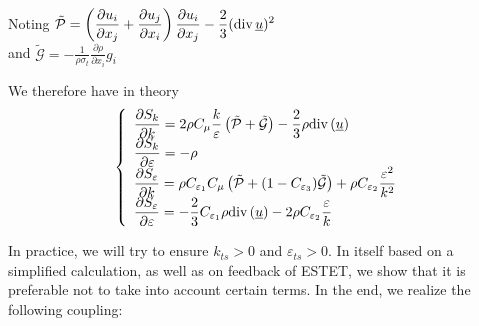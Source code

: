 Noting
$\displaystyle\tilde{\mathcal{P}}
= \left(\frac{\partial u_i}{\partial x_j} +
\frac{\partial u_j}{\partial x_i}\right)\frac{\partial u_i}{\partial x_j}
-\frac{2}{3}(\text{div}\,\underline{u})^2$\\
and
$\displaystyle\tilde{\mathcal{G}}
= -\frac{1}{\rho\sigma_t}
\frac{\partial\rho}{\partial x_i}g_i$

We therefore have in theory
\begin{equation}
\left\{\begin{array}{l}
\displaystyle \frac{\partial S_k}{\partial k}=
2\rho C_\mu\frac{k}{\varepsilon}\left(\tilde{\mathcal{P}}+\tilde{\mathcal{G}}\right)
-\frac{2}{3}\rho \text{div}\,(\underline{u})\\
\displaystyle \frac{\partial S_k}{\partial \varepsilon}= -\rho\\
\displaystyle \frac{\partial S_\varepsilon}{\partial k}=
\rho C_{\varepsilon_1} C_\mu \left(\tilde{\mathcal{P}}
+(1-C_{\varepsilon_3})\tilde{\mathcal{G}}\right)
+\rho C_{\varepsilon_2}\frac{\varepsilon^2}{k^2}\\
\displaystyle \frac{\partial S_\varepsilon}{\partial \varepsilon}=
-\frac{2}{3}C_{\varepsilon_1}\rho \text{div}\,(\underline{u})
-2\rho C_{\varepsilon_2}\frac{\varepsilon}{k}
\end{array}\right.
\end{equation}

In practice, we will try to ensure $k_{ts}>0$ and $\varepsilon_{ts}>0$. In itself
based on a simplified calculation, as well as on feedback
of ESTET, we show that it is preferable not to take into account
certain terms. In the end, we realize the following coupling:

